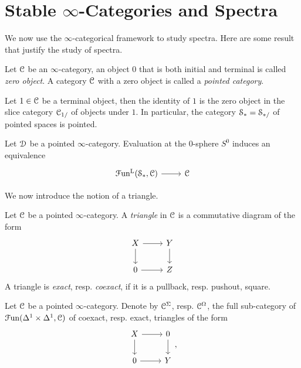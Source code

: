 \documentclass[10pt]{amsart}
\numberwithin{equation}{section}
\begin{document}
\section{Stable \texorpdfstring{$\infty$}{oo}-Categories and Spectra}
We now use the $\infty$-categorical framework to study spectra. Here are some result that justify the study of spectra. 
\begin{definition}
  Let $\mathcal{C}$ be an $\infty$-category, an object $0$ that is both initial and terminal is called 
  \emph{zero object}. A category $\mathcal{C}$ with a zero object is called a \emph{pointed category}.
\end{definition}
\begin{example}
  Let $1\in\mathcal{C}$ be a terminal object, then the identity of $1$ is the zero object in the slice category $\mathcal{C}_{1/}$ of objects under $1$. In particular, the category $\mathcal{S}_*=\mathcal{S}_{*/}$ of pointed spaces is pointed. 
\end{example}
\begin{proposition}
  Let $\mathcal{D}$ be a pointed $\infty$-category. Evaluation at the 0-sphere $S^0$ induces an equivalence \begin{equation}
    \begin{tikzcd}
      \Fun^\mL(\lS_*,\lC) \arrow[r] & \lC
    \end{tikzcd}
  \end{equation}
\end{proposition}
We now introduce the notion of a {triangle}.
\begin{definition}
  Let $\mathcal{C}$ be a pointed $\infty$-category. A \emph{triangle} in $\mathcal{C}$ is a commutative diagram of the form \begin{equation}\label{eq:triangle}
    \begin{tikzcd}
      X \arrow[r] \arrow[d] & Y \arrow[d] \\
      0 \arrow[r] & Z
    \end{tikzcd}
  \end{equation}A triangle is \emph{exact}, resp. \emph{coexact}, if it is a pullback, resp. pushout, square. 
\end{definition}
\begin{definition}
  Let $\mathcal{C}$ be a pointed $\infty$-category. Denote by $\mathcal{C}^{\Sigma}$, resp. $\mathcal{C}^\Omega$, the full sub-category of $\mathcal{F}\mathrm{un}(\Delta^1\times\Delta^1,\mathcal{C})$ of coexact, resp. exact, triangles of the form 
  \begin{equation}\label{eq:exact}
  \begin{tikzcd}
   X \arrow[r]  \arrow[d] & 0 \arrow[d] \\ 
   0 \arrow[r] & Y
  \end{tikzcd},
\end{equation}
\end{definition}
\end{document}
